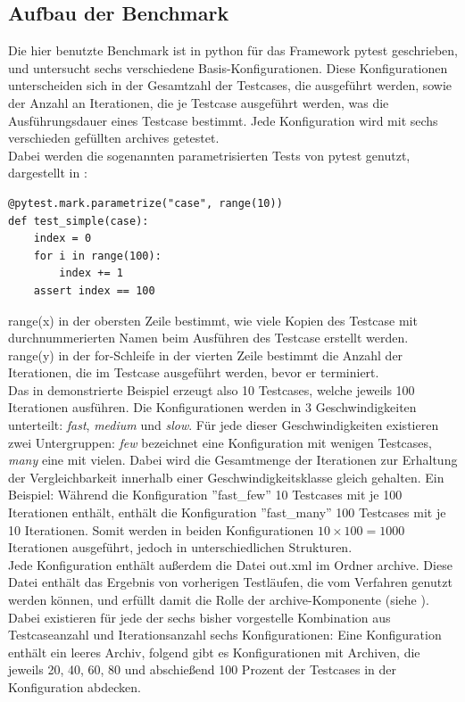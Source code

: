 \subsection{Aufbau der Benchmark}
Die hier benutzte Benchmark ist in python für das Framework pytest geschrieben, und untersucht sechs verschiedene Basis-Konfigurationen. Diese Konfigurationen unterscheiden sich in der Gesamtzahl der Testcases, die ausgeführt werden, sowie der Anzahl an Iterationen, die je Testcase ausgeführt werden, was die Ausführungsdauer eines Testcase bestimmt. Jede Konfiguration wird mit sechs verschieden gefüllten archives getestet.\\
Dabei werden die sogenannten parametrisierten Tests von pytest genutzt, dargestellt in :
\begin{lstlisting}[caption={Inhalt von test\_simple.py aus der Konfiguration ''bench\_fast\_few\_00''}, label={paratestPytest}]
@pytest.mark.parametrize("case", range(10))
def test_simple(case):
    index = 0
    for i in range(100):
        index += 1
    assert index == 100
\end{lstlisting}
range(x) in der obersten Zeile bestimmt, wie viele Kopien des Testcase mit durchnummerierten Namen beim Ausführen des Testcase erstellt werden.\\
range(y) in der for-Schleife in der vierten Zeile bestimmt die Anzahl der Iterationen, die im Testcase ausgeführt werden, bevor er terminiert.\\
Das in  demonstrierte Beispiel erzeugt also 10 Testcases, welche jeweils 100 Iterationen ausführen.
Die Konfigurationen werden in 3 Geschwindigkeiten unterteilt: \textit{fast}, \textit{medium} und \textit{slow}. Für jede dieser Geschwindigkeiten existieren zwei Untergruppen: \textit{few} bezeichnet eine Konfiguration mit wenigen Testcases, \textit{many} eine mit vielen. Dabei wird die Gesamtmenge der Iterationen zur Erhaltung der Vergleichbarkeit innerhalb einer Geschwindigkeitsklasse gleich gehalten. Ein Beispiel: Während die Konfiguration ''fast\_few'' 10 Testcases mit je 100 Iterationen enthält, enthält die Konfiguration ''fast\_many'' 100 Testcases mit je 10 Iterationen. Somit werden in beiden Konfigurationen $10 \times 100=1000$ Iterationen ausgeführt, jedoch in unterschiedlichen Strukturen.\\
Jede Konfiguration enthält außerdem die Datei out.xml im Ordner archive. Diese Datei enthält das Ergebnis von vorherigen Testläufen, die vom Verfahren genutzt werden können, und erfüllt damit die Rolle der archive-Komponente (siehe ). Dabei existieren für jede der sechs bisher vorgestelle Kombination aus Testcaseanzahl und Iterationsanzahl sechs Konfigurationen: Eine Konfiguration enthält ein leeres Archiv, folgend gibt es Konfigurationen mit Archiven, die jeweils 20, 40, 60, 80 und abschießend 100 Prozent der Testcases in der Konfiguration abdecken.

